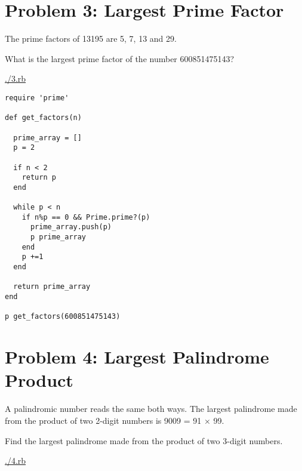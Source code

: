 \documentclass[11pt]{article}
\begin{document}
\section{Problem 3: Largest Prime Factor}
\label{sec-3}

The prime factors of 13195 are 5, 7, 13 and 29.

What is the largest prime factor of the number 600851475143?

\url{./3.rb}

\begin{verbatim}
require 'prime'

def get_factors(n)

  prime_array = []
  p = 2

  if n < 2
    return p
  end

  while p < n
    if n%p == 0 && Prime.prime?(p)
      prime_array.push(p)
      p prime_array
    end
    p +=1
  end

  return prime_array
end

p get_factors(600851475143)
\end{verbatim}

\section{Problem 4: Largest Palindrome Product}
\label{sec-4}

A palindromic number reads the same both ways. The largest palindrome made
from the product of two 2-digit numbers is 9009 = 91 × 99.

Find the largest palindrome made from the product of two 3-digit numbers.

\url{./4.rb}
\end{document}
